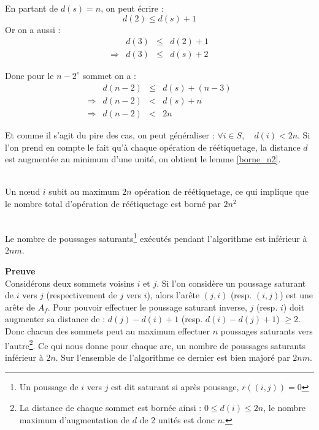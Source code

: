 En partant de $d(s) = n$, on peut écrire : $$
d(2) \leq d(s) + 1 $$ Or on a aussi : $$
\begin{array}{lrcl}
	&d(3) & \leq & d(2) + 1 \\
\Rightarrow & d(3) & \leq & d(s) + 2
\end{array} $$

Donc pour le $n-2^e$ sommet on a : $$
\begin{array}{lrcl}
	&d(n-2) &\leq& d(s) + (n - 3) \\
\Rightarrow & d(n-2) & < & d(s) + n \\
\Rightarrow & d(n-2) & < & 2n 
\end{array} $$

Et comme il s'agit du pire des cas, on peut généraliser : $\forall i \in S, \quad d(i) < 2n $.
Si l'on prend en compte le fait qu'à chaque opération de réétiquetage, la distance $d$ est augmentée
au minimum d'une unité, on obtient le lemme \ref{borne_n2}.

\begin{lemma}~\\
	\label{borne_n2}
	Un n\oe ud $i$ subit au maximum $2n$ opération de réétiquetage, ce qui implique que le nombre total
	d'opération de réétiquetage est borné par $2n^2$
\end{lemma}

\begin{lemma}~\\
	\label{borne_ps}
	Le nombre de poussages saturants\footnote{Un poussage de $i$ vers $j$ est dit saturant si après
	poussage, $r((i,j)) = 0$} exécutés pendant l'algorithme est inférieur à $2nm$.
\end{lemma}

\textbf{Preuve}\\
Considérons deux sommets voisins $i$ et $j$. Si l'on considère un poussage saturant de $i$ vers
$j$ (respectivement de $j$ vers $i$), alors l'arête $(j, i)$ (resp. $(i,j)$) est une arête de $A_f$.
Pour pouvoir effectuer le poussage saturant inverse, $j$ (resp. $i$) doit augmenter sa distance de
: $d(j) - d(i) + 1$ (resp. $d(i) - d(j) + 1$) $\geq 2$. Donc chacun des sommets peut au maximum
effectuer $n$ poussages saturants vers l'autre\footnote{La distance de chaque sommet est bornée
ainsi : $0 \leq d(i) \leq 2n$, le nombre maximum d'augmentation de $d$ de 2 unités est donc $n$.}.
Ce qui nous donne pour chaque arc, un nombre de poussages saturants inférieur à $2n$. Sur
l'ensemble de l'algorithme ce dernier est bien majoré par $2nm$.

